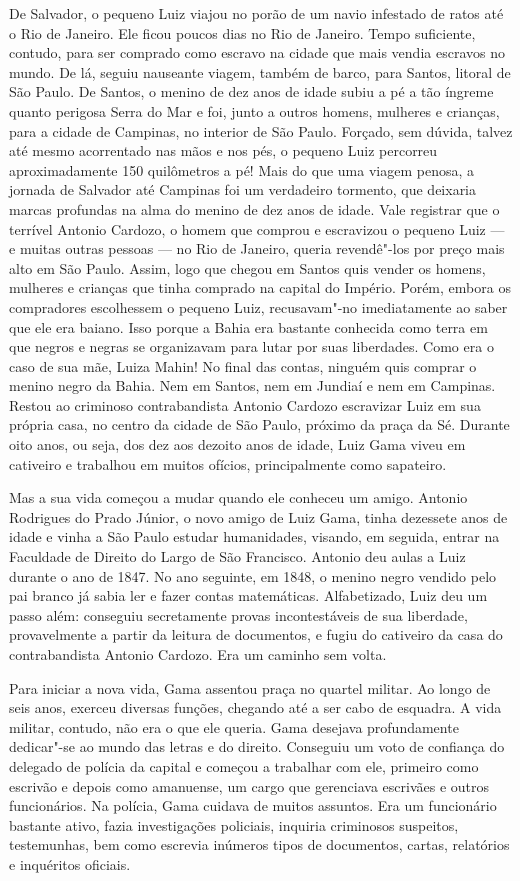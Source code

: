 De Salvador, o pequeno Luiz viajou no porão de um navio infestado de
ratos até o Rio de Janeiro. Ele ficou poucos dias no Rio de Janeiro.
Tempo suficiente, contudo, para ser comprado como escravo na cidade que
mais vendia escravos no mundo. De lá, seguiu nauseante viagem, também de
barco, para Santos, litoral de São Paulo. De Santos, o menino de dez
anos de idade subiu a pé a tão íngreme quanto perigosa Serra do Mar e
foi, junto a outros homens, mulheres e crianças, para a cidade de
Campinas, no interior de São Paulo. Forçado, sem dúvida, talvez até
mesmo acorrentado nas mãos e nos pés, o pequeno Luiz percorreu
aproximadamente 150 quilômetros a pé! Mais do que uma viagem penosa, a
jornada de Salvador até Campinas foi um verdadeiro tormento, que
deixaria marcas profundas na alma do menino de dez anos de idade. Vale
registrar que o terrível Antonio Cardozo, o homem que comprou e
escravizou o pequeno Luiz --- e muitas outras pessoas --- no Rio de Janeiro,
queria revendê"-los por preço mais alto em São Paulo. Assim, logo que
chegou em Santos quis vender os homens, mulheres e crianças que tinha
comprado na capital do Império. Porém, embora os compradores escolhessem
o pequeno Luiz, recusavam"-no imediatamente ao saber que ele era baiano.
Isso porque a Bahia era bastante conhecida como terra em que negros e
negras se organizavam para lutar por suas liberdades. Como era o caso de
sua mãe, Luiza Mahin! No final das contas, ninguém quis comprar o menino
negro da Bahia. Nem em Santos, nem em Jundiaí e nem em Campinas. Restou
ao criminoso contrabandista Antonio Cardozo escravizar Luiz em sua
própria casa, no centro da cidade de São Paulo, próximo da praça da Sé.
Durante oito anos, ou seja, dos dez aos dezoito anos de idade, Luiz Gama
viveu em cativeiro e trabalhou em muitos ofícios, principalmente como
sapateiro.

Mas a sua vida começou a mudar quando ele conheceu um amigo. Antonio
Rodrigues do Prado Júnior, o novo amigo de Luiz Gama, tinha dezessete
anos de idade e vinha a São Paulo estudar humanidades, visando, em
seguida, entrar na Faculdade de Direito do Largo de São Francisco.
Antonio deu aulas a Luiz durante o ano de 1847. No ano seguinte, em
1848, o menino negro vendido pelo pai branco já sabia ler e fazer contas
matemáticas. Alfabetizado, Luiz deu um passo além: conseguiu
secretamente provas incontestáveis de sua liberdade, provavelmente a
partir da leitura de documentos, e fugiu do cativeiro da casa do
contrabandista Antonio Cardozo. Era um caminho sem volta.

Para iniciar a nova vida, Gama assentou praça no quartel militar. Ao
longo de seis anos, exerceu diversas funções, chegando até a ser cabo de
esquadra. A vida militar, contudo, não era o que ele queria. Gama
desejava profundamente dedicar"-se ao mundo das letras e do direito.
Conseguiu um voto de confiança do delegado de polícia da capital e
começou a trabalhar com ele, primeiro como escrivão e depois como
amanuense, um cargo que gerenciava escrivães e outros funcionários. Na
polícia, Gama cuidava de muitos assuntos. Era um funcionário bastante
ativo, fazia investigações policiais, inquiria criminosos suspeitos,
testemunhas, bem como escrevia inúmeros tipos de documentos, cartas,
relatórios e inquéritos oficiais.


